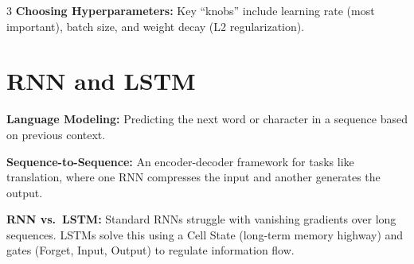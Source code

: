 \documentclass[6pt,landscape,a4paper]{extarticle}
\begin{document}
\begin{multicols}{3}
\textbf{Choosing Hyperparameters:} Key ``knobs'' include learning rate (most important), batch size, and weight decay (L2 regularization).

\section{RNN and LSTM}

\textbf{Language Modeling:} Predicting the next word or character in a sequence based on previous context.

\textbf{Sequence-to-Sequence:} An encoder-decoder framework for tasks like translation, where one RNN compresses the input and another generates the output.

\textbf{RNN vs.\ LSTM:} Standard RNNs struggle with vanishing gradients over long sequences. LSTMs solve this using a Cell State (long-term memory highway) and gates (Forget, Input, Output) to regulate information flow.

\end{multicols}

\newpage
\end{document}
